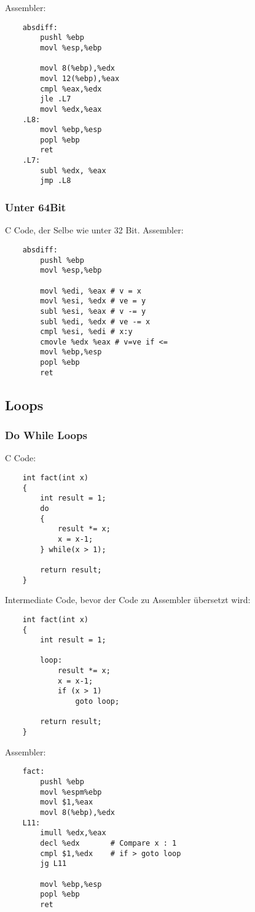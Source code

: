 \documentclass[a4paper, 11pt]{article}
\begin{document}
Assembler:
\begin{lstlisting}
	absdiff:
		pushl %ebp
		movl %esp,%ebp
		
		movl 8(%ebp),%edx
		movl 12(%ebp),%eax
		cmpl %eax,%edx
		jle .L7			 
		movl %edx,%eax 
	.L8:
		movl %ebp,%esp
		popl %ebp
		ret
	.L7:
		subl %edx, %eax
		jmp .L8
\end{lstlisting}

\subsubsection{Unter 64Bit}
C Code, der Selbe wie unter 32 Bit.
Assembler:
\begin{lstlisting}
	absdiff:
		pushl %ebp
		movl %esp,%ebp
		
		movl %edi, %eax	# v = x
		movl %esi, %edx	# ve = y
		subl %esi, %eax # v -= y
		subl %edi, %edx # ve -= x
		cmpl %esi, %edi # x:y
		cmovle %edx %eax # v=ve if <=
		movl %ebp,%esp
		popl %ebp
		ret
\end{lstlisting}

\subsection{Loops}
\subsubsection{Do While Loops}
C Code:
\begin{lstlisting}
	int fact(int x)
	{
		int result = 1;
		do
		{
			result *= x;
			x = x-1;
		} while(x > 1);
		
		return result;
	}
\end{lstlisting}

Intermediate Code, bevor der Code zu Assembler übersetzt wird:
\begin{lstlisting}
	int fact(int x)
	{
		int result = 1;
		
		loop:
			result *= x;
			x = x-1;
			if (x > 1)
		 		goto loop;
		
		return result;
	}
\end{lstlisting}

Assembler:
\begin{lstlisting}
	fact:
		pushl %ebp
		movl %espm%ebp
		movl $1,%eax
		movl 8(%ebp),%edx
	L11:
		imull %edx,%eax
		decl %edx		# Compare x : 1
		cmpl $1,%edx	# if > goto loop
		jg L11
		
		movl %ebp,%esp
		popl %ebp
		ret
\end{lstlisting}
\end{document}
